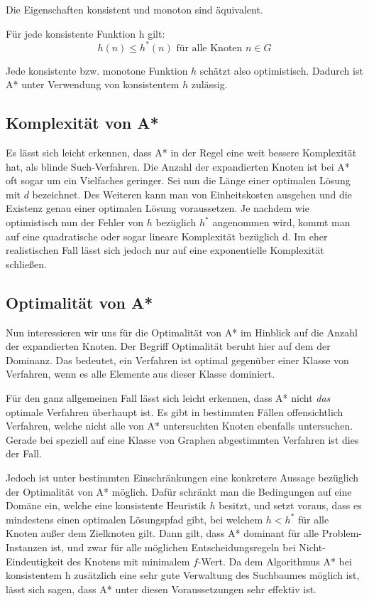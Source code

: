 \begin{theor}
	Die Eigenschaften konsistent und monoton sind äquivalent.
\end{theor}

\begin{theor}
	Für jede konsistente Funktion h gilt: \[h(n)\leq h^{*}(n)\textrm{ für alle Knoten } n \in G\]
\end{theor}
Jede konsistente bzw. monotone Funktion $h$ schätzt also optimistisch. Dadurch ist A* unter Verwendung von konsistentem $h$ zulässig.

\subsection{Komplexität von A*}

Es lässt sich leicht erkennen, dass A* in der Regel eine weit bessere Komplexität hat, als blinde Such-Verfahren. Die Anzahl der expandierten Knoten ist bei A* oft sogar um ein Vielfaches geringer. Sei nun die Länge einer optimalen Lösung mit $d$ bezeichnet. Des Weiteren kann man von Einheitskosten ausgehen und die Existenz genau einer optimalen Lösung voraussetzen.
Je nachdem wie optimistisch nun der Fehler von $h$ bezüglich $h^{*}$ angenommen wird, kommt man auf eine quadratische oder sogar lineare Komplexität bezüglich d. Im eher realistischen Fall lässt sich jedoch nur auf eine exponentielle Komplexität schließen.
\subsection{Optimalität von A*}

Nun interessieren wir uns für die Optimalität von A* im Hinblick auf die Anzahl der expandierten Knoten.
Der Begriff Optimalität beruht hier auf dem der Dominanz. Das bedeutet, ein Verfahren ist optimal gegenüber einer Klasse von Verfahren, wenn es alle Elemente aus dieser Klasse dominiert.

Für den ganz allgemeinen Fall lässt sich leicht erkennen, dass A* nicht \textit{das} optimale Verfahren überhaupt ist. Es gibt in bestimmten Fällen offensichtlich Verfahren, welche nicht alle von A* untersuchten Knoten ebenfalls untersuchen. Gerade bei speziell auf eine Klasse von Graphen abgestimmten Verfahren ist dies der Fall.

Jedoch ist unter bestimmten Einschränkungen eine konkretere Aussage bezüglich der Optimalität von A* möglich. Dafür schränkt man die Bedingungen auf eine Domäne ein, welche eine konsistente Heuristik $h$ besitzt, und setzt voraus, dass es mindestens einen optimalen Lösungspfad gibt, bei welchem $h < h^{*}$ für alle Knoten außer dem Zielknoten gilt. Dann gilt, dass A* dominant für alle Problem-Instanzen ist, und zwar für alle möglichen Entscheidungsregeln bei Nicht-Eindeutigkeit des Knotens mit minimalem $f$-Wert. Da dem Algorithmus A* bei konsistentem h zusätzlich eine sehr gute Verwaltung des Suchbaumes möglich ist, lässt sich sagen, dass A* unter diesen Voraussetzungen sehr effektiv ist.
